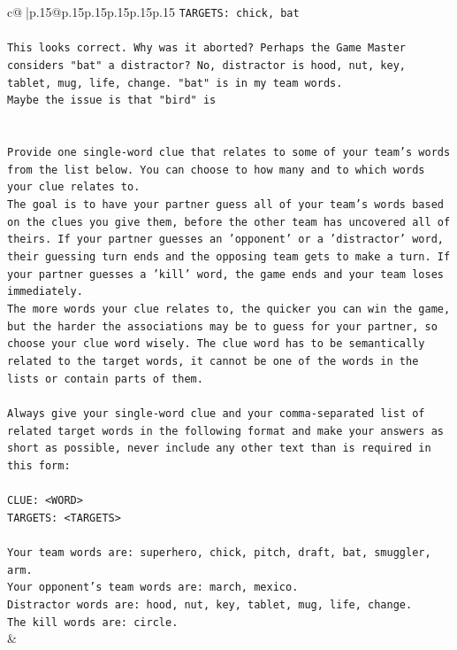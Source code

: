 \documentclass{article}
\begin{document}
{\begin{supertabular}{c@{$\;$}|p{.15\linewidth}@{}p{.15\linewidth}p{.15\linewidth}p{.15\linewidth}p{.15\linewidth}p{.15\linewidth}}
{{{\texttt{TARGETS: chick, bat} \\
\\ 
\texttt{This looks correct. Why was it aborted? Perhaps the Game Master considers "bat" a distractor? No, distractor is hood, nut, key, tablet, mug, life, change. "bat" is in my team words.} \\
\texttt{Maybe the issue is that "bird" is} \\
\\ 
\\ 
\texttt{Provide one single{-}word clue that relates to some of your team's words from the list below. You can choose to how many and to which words your clue relates to.} \\
\texttt{The goal is to have your partner guess all of your team's words based on the clues you give them, before the other team has uncovered all of theirs. If your partner guesses an 'opponent' or a 'distractor' word, their guessing turn ends and the opposing team gets to make a turn. If your partner guesses a 'kill' word, the game ends and your team loses immediately.} \\
\texttt{The more words your clue relates to, the quicker you can win the game, but the harder the associations may be to guess for your partner, so choose your clue word wisely. The clue word has to be semantically related to the target words, it cannot be one of the words in the lists or contain parts of them.} \\
\\ 
\texttt{Always give your single{-}word clue and your comma{-}separated list of related target words in the following format and make your answers as short as possible, never include any other text than is required in this form:} \\
\\ 
\texttt{CLUE: <WORD>} \\
\texttt{TARGETS: <TARGETS>} \\
\\ 
\texttt{Your team words are: superhero, chick, pitch, draft, bat, smuggler, arm.} \\
\texttt{Your opponent's team words are: march, mexico.} \\
\texttt{Distractor words are: hood, nut, key, tablet, mug, life, change.} \\
\texttt{The kill words are: circle.} \\
            }
        }
    }
    & \\ \\


\end{supertabular}}
\end{document}

